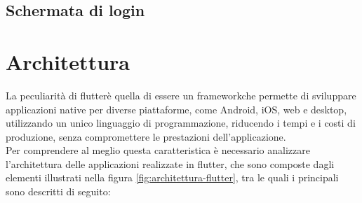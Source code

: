 \subsection{Schermata di login}
\label{subsec:login}


\section{Architettura}
\label{sec:architettura}

La peculiarità di \gls{flutter}\glsoccur è quella di essere un \gls{framework}\glsoccur che permette di sviluppare applicazioni native per diverse piattaforme, come Android, iOS, web e desktop, utilizzando un unico linguaggio di programmazione, riducendo i tempi e i costi di produzione, senza compromettere le prestazioni dell'applicazione.\\
Per comprendere al meglio questa caratteristica è necessario analizzare l'architettura delle applicazioni realizzate in \gls{flutter}\glsoccur, che sono composte dagli elementi illustrati nella figura \ref{fig:architettura-flutter}, tra le quali i principali sono descritti di seguito:
